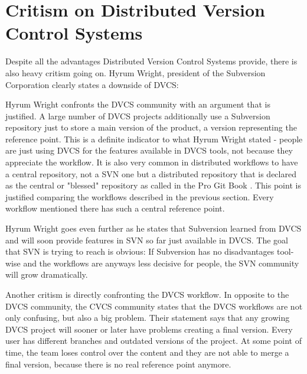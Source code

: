 \section{Critism on Distributed Version Control Systems}\label{critismondvcs}

Despite all the advantages Distributed Version Control Systems provide, there is also heavy critism going on. Hyrum Wright, president of the Subversion Corporation clearly states a downside of DVCS: 

 \cite{subversionandgit}

Hyrum Wright confronts the DVCS community with an argument that is justified. A large number of DVCS projects additionally use a Subversion repository just to store a main version of the product, a version representing the reference point. This is a definite indicator to what Hyrum Wright stated - people are just using DVCS for the features available in DVCS tools, not because they appreciate the workflow. It is also very common in distributed workflows to have a central repository, not a SVN one but a distributed repository that is declared as the central or "blessed" repository as called in the Pro Git Book \cite[chapter 5.1]{gitpro2009}. This point is justified comparing the workflows described in the previous section. Every workflow mentioned there has such a central reference point.

Hyrum Wright goes even further as he states that Subversion learned from DVCS and will soon provide features in SVN so far just available in DVCS. \cite{subversionandgit} The goal that SVN is trying to reach is obvious: If Subversion has no disadvantages tool-wise and the workflows are anyways less decisive for people, the SVN community will grow dramatically.

Another critism is directly confronting the DVCS workflow. In opposite to the DVCS community, the CVCS community states that the DVCS workflows are not only confusing, but also a big problem. Their statement says that any growing DVCS project will sooner or later have problems creating a final version. Every user has different branches and outdated versions of the project. At some point of time, the team loses control over the content and they are not able to merge a final version, because there is no real reference point anymore. 
